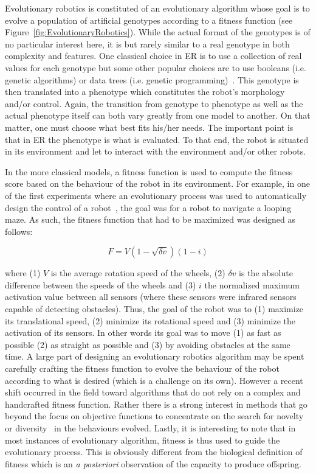     Evolutionary robotics is constituted of an evolutionary algorithm whose goal is to evolve a population of artificial genotypes according to a fitness function (see Figure~\ref{fig:EvolutionaryRobotics}). While the actual format of the genotypes is of no particular interest here, it is but rarely similar to a real genotype in both complexity and features. One classical choice in ER is to use a collection of real values for each genotype but some other popular choices are to use booleans (i.e. genetic algorithms) or data trees (i.e. genetic programming)~\parencite{Eiben2015}. This genotype is then translated into a phenotype which constitutes the robot's morphology and/or control. Again, the transition from genotype to phenotype as well as the actual phenotype itself can both vary greatly from one model to another. On that matter, one must choose what best fits his/her needs. The important point is that in ER the phenotype is what is evaluated. To that end, the robot is situated in its environment and let to interact with the environment and/or other robots. 

    
    In the more classical models, a fitness function is used to compute the fitness score based on the behaviour of the robot in its environment. For example, in one of the first experiments where an evolutionary process was used to automatically design the control of a robot~\parencite{Floreano1994}, the goal was for a robot to navigate a looping maze. As such, the fitness function that had to be maximized was designed as follows:

    \[
      F = V(1-\sqrt{\delta v})(1-i)
    \]

    where (1) $V$ is the average rotation speed of the wheels, (2) $\delta v$ is the absolute difference between the speeds of the wheels and (3) $i$ the normalized maximum activation value between all sensors (where these sensors were infrared sensors capable of detecting obstacles). Thus, the goal of the robot was to (1) maximize its translational speed, (2) minimize its rotational speed and (3) minimize the activation of its sensors. In other words its goal was to move (1) as fast as possible (2) as straight as possible and (3) by avoiding obstacles at the same time. A large part of designing an evolutionary robotics algorithm may be spent carefully crafting the fitness function to evolve the behaviour of the robot according to what is desired (which is a challenge on its own). However a recent shift occurred in the field toward algorithms that do not rely on a complex and handcrafted fitness function. Rather there is a strong interest in methods that go beyond the focus on objective functions to concentrate on the search for novelty~\parencite{Lehman2008, Lehman2011} or diversity~\parencite{Mouret2012a} in the behaviours evolved. Lastly, it is interesting to note that in most instances of evolutionary algorithm, fitness is thus used to guide the evolutionary process. This is obviously different from the biological definition of fitness which is an \emph{a posteriori} observation of the capacity to produce offspring. 

